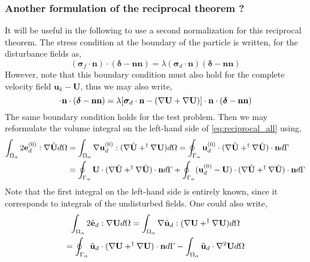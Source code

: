 \subsubsection{Another formulation of the reciprocal theorem ? }
It will be useful in the following to use a second normalization for this reciprocal theorem. 
The stress condition at the boundary of the particle is written, for the disturbance fields as, 
\begin{equation*}
    (\bm\sigma_f\cdot\textbf{n})\cdot (\bm\delta - \textbf{nn})
    = \lambda (\bm\sigma_d\cdot \textbf{n})(\bm\delta - \textbf{nn})
\end{equation*}
However, note that this boundary condition must also hold for the complete velocity field $\textbf{u}_k - \textbf{U}$, thus we may also write, 
\begin{equation*}
    [\bm\sigma_f
    - (\grad \textbf{U}+\grad \textbf{U})
    ]\cdot \textbf{n}\cdot  (\bm\delta - \textbf{nn})
    = 
    \lambda [\bm\sigma_d\cdot \textbf{n}
    - (\grad \textbf{U}+\grad \textbf{U})
    ]\cdot \textbf{n}\cdot (\bm\delta - \textbf{nn})
\end{equation*}
The same boundary condition holds for the test problem. 
Then we may reformulate the volume integral on the left-hand side of \ref{eq:reciprocal_all} using, 
\begin{align*}
    \int_{\Omega_{\alpha}}  2\textbf{e}_d^{(0)} : \mathbf{\nabla} \hat{\textbf{U}}  d\Omega
    &=\int_{\Omega_{\alpha}}  \mathbf{\nabla} \textbf{u}_d^{(0)} : (\mathbf{\nabla} \hat{\textbf{U}} +^\dagger \mathbf{\nabla} \textbf{U})  d\Omega
    =
    \oint_{\Gamma_{\alpha}}   \textbf{u}_d^{(0)} \cdot (\mathbf{\nabla} \hat{\textbf{U}} + ^\dagger\mathbf{\nabla} \hat{\textbf{U}})  \cdot \textbf{n} d\Gamma\\
    &=
    \oint_{\Gamma_{\alpha}}   \textbf{U} \cdot (\mathbf{\nabla} \hat{\textbf{U}} + ^\dagger\mathbf{\nabla} \hat{\textbf{U}})  \cdot \textbf{n} d\Gamma
    + \oint_{\Gamma_{\alpha}}   (\textbf{u}_d^{(0)} - \textbf{U})\cdot (\mathbf{\nabla} \hat{\textbf{U}} + ^\dagger\mathbf{\nabla} \hat{\textbf{U}})  \cdot \textbf{n} d\Gamma
    \\
\end{align*}
Note that the first integral on the left-hand side is entirely known, since it corresponds to integrals of the undisturbed fields.
One could also write, 
\begin{multline}
    \int_{\Omega_{\alpha}}  2\hat{\textbf{e}}_d : \mathbf{\nabla} {\textbf{U}}  d\Omega
    =\int_{\Omega_{\alpha}}  \mathbf{\nabla} \hat{\textbf{u}}_d : (\mathbf{\nabla} {\textbf{U}} +^\dagger \mathbf{\nabla} \textbf{U})  d\Omega\\
    =
    \oint_{\Gamma_{\alpha}}   \hat{\textbf{u}}_d \cdot (\mathbf{\nabla} {\textbf{U}} + ^\dagger\mathbf{\nabla} {\textbf{U}})  \cdot \textbf{n} d\Gamma
    -\int_{\Omega_{\alpha}} \hat{\textbf{u}}_d \cdot \mathbf{\nabla}^2 {\textbf{U}}  d\Omega
\end{multline}
